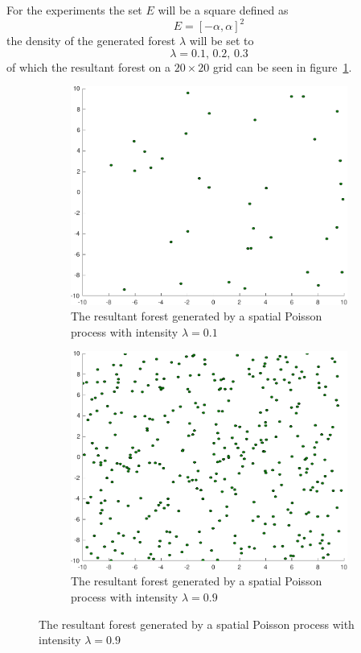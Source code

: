 For the experiments the set \(E\) will be a square defined as
\[
  E = {[-\alpha, \alpha]}^2
\]
the density of the generated forest \(\lambda\) will be set to
\[
  \lambda = 0.1,\, 0.2,\, 0.3
\]
of which the resultant forest on a \(20 \times 20\) grid can be seen in
figure~\cref{fig:poisson009}.

\begin{figure}
  \begin{subfigure}[b]{0.5\textwidth} \includegraphics[width=\textwidth]{figures/experiments/poisson009}
    \caption{The resultant forest generated by a spatial Poisson process with
      intensity \(\lambda = 0.1\)}
    \label{fig:poisson009}
  \end{subfigure}%
  \;
  \begin{subfigure}[b]{0.5\textwidth}
    \includegraphics[width=\textwidth]{figures/experiments/poisson09}
    \caption{The resultant forest generated by a spatial Poisson process with
      intensity \(\lambda = 0.9\)}
    \label{fig:poisson09}
  \end{subfigure}
\end{figure}

